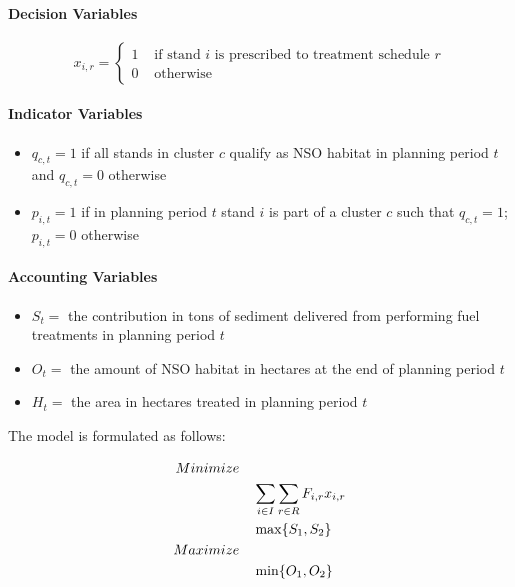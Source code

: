 \paragraph{Decision Variables}
$$
x_{i,r} = \begin{cases}
1 &\text{ if stand $i$ is prescribed to treatment schedule $r$}\\
0 &\text{ otherwise}
\end{cases}
$$ 

\paragraph{Indicator Variables}
\begin{itemize}
\item \textbf{$q_{c,t} = 1$} if all stands in cluster $c$ qualify as NSO habitat in planning period $t$ and $q_{c,t} = 0$ otherwise
\item \textbf{$p_{i,t} = 1$} if in planning period $t$ stand $i$ is part of a cluster $c$ such that $q_{c,t} = 1$; $p_{i,t} = 0$ otherwise
\end{itemize}

\paragraph{Accounting Variables}
\begin{itemize}
\item \textbf{$S_t = $} the contribution in tons of sediment delivered from performing fuel treatments in planning period $t$
\item \textbf{$O_t = $} the amount of NSO habitat in hectares at the end of planning period $t$
\item \textbf{$H_t = $} the area in hectares treated in planning period $t$
\end{itemize}

The model is formulated as follows:

\begin{align}
Minimize \quad & \notag\\
&\sum_{i\in I}\sum_{r\in R} F_{i,r} x_{i,r} \label{eqn:objFire} \\
&\max \{S_1,S_2\} \label{eqn:objSediment} \\
Maximize \quad & \notag\\
&\min \{O_1,O_2\} \label{eqn:objOwl}
\end{align}

